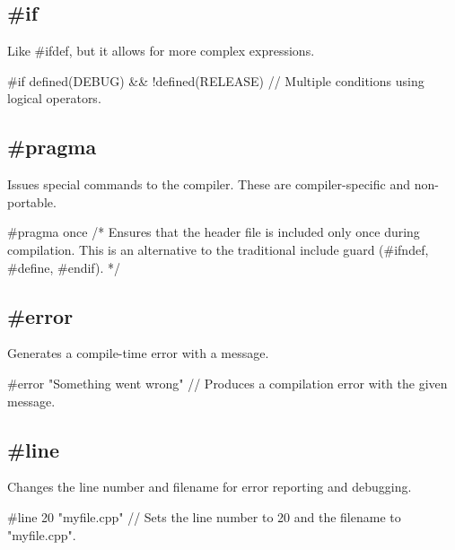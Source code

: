 \documentclass{report}
\begin{document}
    \bigbreak \noindent 
    \subsection{\#if}
    \bigbreak \noindent 
    Like \#ifdef, but it allows for more complex expressions.
    \bigbreak \noindent 
    
    \begin{cppcode}
#if defined(DEBUG) && !defined(RELEASE) // Multiple conditions using logical operators.
    \end{cppcode}
    

    \bigbreak \noindent 
    \subsection{\#pragma}
    \bigbreak \noindent 
    Issues special commands to the compiler. These are compiler-specific and non-portable.
    \bigbreak \noindent 
    
    \begin{cppcode}
#pragma once 
/* Ensures that the header file is included only once during compilation. 
This is an alternative to the traditional include guard (#ifndef, #define, #endif). */
    \end{cppcode}
    

    \bigbreak \noindent 
    \subsection{\#error}
    \bigbreak \noindent 
    Generates a compile-time error with a message.
    \bigbreak \noindent 
    
    \begin{cppcode}
#error "Something went wrong" // Produces a compilation error with the given message.
    \end{cppcode}
    

    \bigbreak \noindent 
    \subsection{\#line}
    \bigbreak \noindent 
    Changes the line number and filename for error reporting and debugging.
    \bigbreak \noindent 
    
    \begin{cppcode}
#line 20 "myfile.cpp" // Sets the line number to 20 and the filename to "myfile.cpp".
    \end{cppcode}
    

    \pagebreak \bigbreak \noindent 
\end{document}
